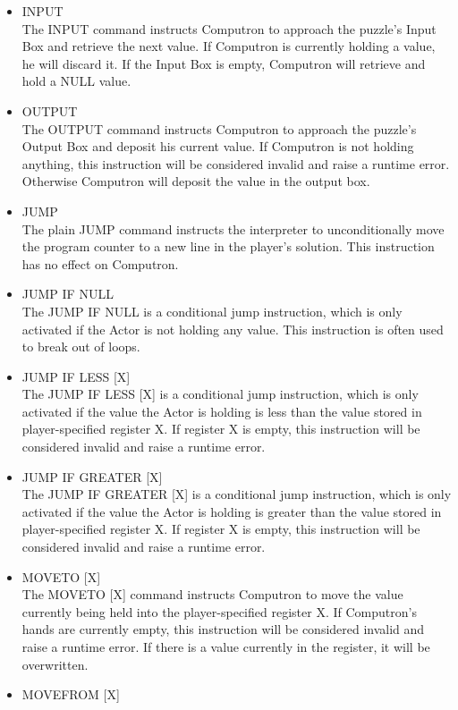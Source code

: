 \begin{itemize}
 	\item INPUT\\
	The INPUT command instructs Computron to approach the puzzle's Input Box and 
	retrieve the next value. If Computron is currently holding a value, he will discard it. 
	If the Input Box is empty, Computron will retrieve and hold a NULL value.
	\item OUTPUT\\
	The OUTPUT command instructs Computron to approach the puzzle's Output Box 
	and deposit his current value. If Computron is not holding anything, this instruction 
	will be considered invalid and raise a runtime error. Otherwise Computron will deposit 
	the value in the output box.
	\item JUMP\\
	The plain JUMP command instructs the interpreter to unconditionally move the program 
	counter to a new line in the player's solution. This instruction has no effect on Computron.
	\item JUMP IF NULL\\
	The JUMP IF NULL is a conditional jump instruction, which is only activated if the Actor
	 is not holding any value. This instruction is often used to break out of loops.
	\item JUMP IF LESS [X]\\
	The JUMP IF LESS [X] is a conditional jump instruction, which is only activated if the 
	value the Actor is holding is less than the value stored in player-specified register X. If 
	register X is empty, this instruction will be considered invalid and raise a runtime error.
	\item JUMP IF GREATER [X]\\
	The JUMP IF GREATER [X] is a conditional jump instruction, which is only activated if 
	the value the Actor is holding is greater than the value stored in player-specified register 
	X. If register X is empty, this instruction will be considered invalid and raise a runtime error.
	\item MOVETO [X]\\
	The MOVETO [X] command instructs Computron to move the value currently being 
	held into the player-specified register X. If Computron's hands are currently empty, this 
	instruction will be considered invalid and raise a runtime error. If there is a value currently in 
	the register, it will be overwritten.
	\item MOVEFROM [X]\\

\end{itemize}

